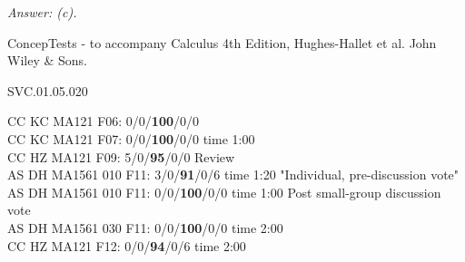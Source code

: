 {\it Answer: (c).} 

\medskip

\medskip
ConcepTests - to accompany Calculus 4th Edition, Hughes-Hallet et al. John Wiley \& Sons.

SVC.01.05.020

CC KC MA121 F06: 0/0/{\bf 100}/0/0 \\
CC KC MA121 F07: 0/0/{\bf 100}/0/0 time 1:00 \\
CC HZ MA121 F09: 5/0/{\bf95}/0/0 Review \\
AS DH MA1561 010 F11: 3/0/{\bf91}/0/6 time 1:20 "Individual, pre-discussion vote" \\
AS DH MA1561 010 F11: 0/0/{\bf100}/0/0 time 1:00 Post small-group discussion vote \\
AS DH MA1561 030 F11: 0/0/{\bf100}/0/0 time 2:00  \\
CC HZ MA121 F12: 0/0/{\bf94}/0/6 time 2:00  \\
